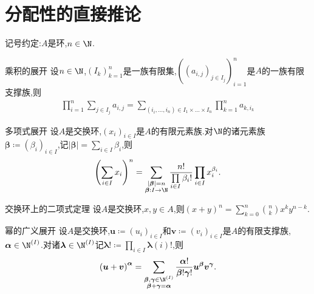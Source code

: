 \section{分配性的直接推论}

记号约定:$A$是环,$n\in\N$.

\begin{proposition}{乘积的展开}{}
	设$n\in\N$,$\left(I_{k}\right)_{k=1}^{n}$是一族有限集,$\left(\left(a_{i,j}\right)_{j\in I_{j}}\right)_{i=1}^{n}$是$A$的一族有限支撑族,则
	\begin{align*}
		\prod\limits_{i=1}^{n}\sum\limits_{j\in I_{j}}a_{i,j}=\sum\limits_{\left(i_{i},\ldots,i_{n}\right)\in I_{1}\times\ldots\times I_{n}}\prod\limits_{k=1}^{n}a_{k,i_{k}}
	\end{align*}
\end{proposition}

\begin{proposition}{多项式展开}{}
	设$A$是交换环,$\left(x_{i}\right)_{i\in I}$是$A$的有限元素族.对$\N$的诸元素族$\boldsymbol{\beta}\coloneq\left(\beta_{i}\right)_{i\in I}$,记$\left|\boldsymbol{\beta}\right|=\sum\limits_{i\in I}\beta_{i}$,则
	\begin{align*}
		\left(\sum\limits_{i\in I}x_{i}\right)^{n}=\sum\limits_{\substack{\left|\boldsymbol{\beta}\right|=n\\ \boldsymbol{\beta}:I\to\N}}\dfrac{n!}{\prod\limits_{i\in I}\beta_{i}!}\prod\limits_{i\in I}x_{i}^{\beta_{i}}.
	\end{align*}
\end{proposition}

\begin{corollary}{交换环上的二项式定理}{}
	设$A$是交换环,$x,y\in A$,则$\left(x+y\right)^{n}=\sum\limits_{k=0}^{n}\binom{n}{k}x^{k}y^{n-k}$.
\end{corollary}

\begin{corollary}{幂的广义展开}{}
	设$A$是交换环,$\boldsymbol{u}\coloneq\left(u_{i}\right)_{i\in I}$和$\boldsymbol{v}\coloneq\left(v_{i}\right)_{i\in I}$是$A$的有限支撑族,$\boldsymbol{\alpha}\in\N^{\left(I\right)}$.对诸$\boldsymbol{\lambda}\in\N^{\left(I\right)}$记$\boldsymbol{\lambda}!\coloneq\prod\limits_{i\in I}\boldsymbol{\lambda}\left(i\right)!$,则
	\begin{align*}
		\left(\boldsymbol{u}+\boldsymbol{v}\right)^{\boldsymbol{\alpha}}=\sum\limits_{\substack{\boldsymbol{\beta},\boldsymbol{\gamma}\in\N^{\left(I\right)}\\ \boldsymbol{\beta}+\boldsymbol{\gamma}=\boldsymbol{\alpha}}}\dfrac{\boldsymbol{\alpha}!}{\boldsymbol{\beta}!\boldsymbol{\gamma}!}\boldsymbol{u}^{\boldsymbol{\beta}}\boldsymbol{v}^{\boldsymbol{\gamma}}.
	\end{align*}
\end{corollary}

